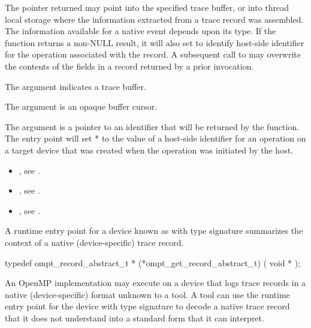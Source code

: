 \descr

The pointer returned  may point into the specified trace buffer, or into
thread local storage where the information extracted from a trace
record was assembled. The information available for a native event
depends upon its type. If the function returns a non-NULL result,
it will also set  to identify host-side identifier
for the operation associated with the record.  A subsequent call
to  may overwrite the
contents of the fields in a record returned by a prior invocation.

\argdesc
The argument  indicates a trace buffer.

The argument  is an opaque buffer cursor.

The argument  is a pointer to an identifier
that will be returned by the function. The entry point will set
* to the value of a host-side identifier for an operation on
a target device that was created when the operation was initiated by
the host.


\crossreferences
\begin{itemize}
\item {},
see .
\item {},
see .
\item {},
see .
\end{itemize}

\label{sec:ompt_get_record_abstract_t}

\summary
A runtime entry point for a device known as
with type signature
summarizes the context of a native (device-specific) trace record.

\format
\begin{ccppspecific}
\begin{omptOther}
typedef ompt_record_abstract_t *
(*ompt_get_record_abstract_t) (
  void *
);
\end{omptOther}
\end{ccppspecific}

\descr
An OpenMP implementation may execute on a device that logs
trace records in a native (device-specific) format unknown to a tool.
A tool can use the 
runtime entry point for the device with type signature
to decode a native trace record that it
does not understand into a standard form that it can interpret.

